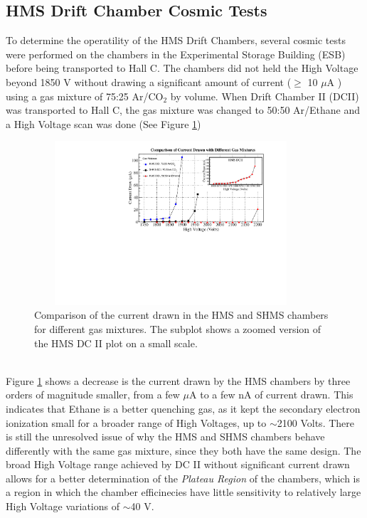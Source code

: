 \documentclass[letterpaper, 10 pt, conference]{ieeeconf}  %
\begin{document}
\subsection{HMS Drift Chamber Cosmic Tests}
To determine the operatility of the HMS Drift Chambers, several cosmic tests were performed on the chambers in the Experimental Storage Building (ESB) before being transported
to Hall C. The chambers did not held the High Voltage beyond 1850 V without drawing a significant amount of current ($\geq$ 10 $\mu$A ) using a gas mixture of 75:25 Ar/CO$_{2}$ by
volume. When Drift Chamber II (DCII) was transported to Hall C, the gas mixture was changed to 50:50 Ar/Ethane and a High Voltage scan was done (See Figure \ref{fig:current_draw})  
\begin{figure}[h!]
  \centering
  \includegraphics[width=4.0in, height=2.4in]{dc2_tests/gas_mix_current_drawn.pdf}
  \caption{Comparison of the current drawn in the HMS and SHMS chambers for different gas mixtures. The subplot shows a zoomed version of the HMS DC II plot on a small scale.}
  \label{fig:current_draw}
\end{figure} \\
Figure \ref{fig:current_draw} shows a decrease is the current drawn by the HMS chambers by three orders of magnitude smaller, from a few $\mu$A to a few nA of current drawn. This
indicates that Ethane is a better quenching gas, as it kept the secondary electron ionization small for a broader range of High Voltages, up to $\sim$2100 Volts. There is still the
unresolved issue of why the HMS and SHMS chambers behave differently with the same gas mixture, since they both have the same design. The broad High Voltage range achieved by DC II without
significant current drawn allows for a better determination of the \textit{Plateau Region} of the chambers, which is a region in which the chamber efficinecies have little sensitivity
to relatively large High Voltage variations of $\sim$40 V. \\
\end{document}
